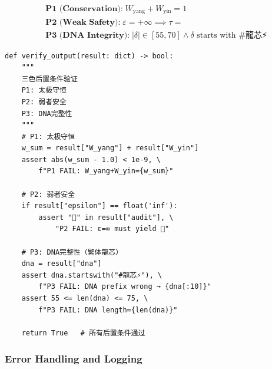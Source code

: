 \documentclass[conference]{IEEEtran}
\begin{document}
\begin{align}
  &\textbf{P1 (Conservation):}\;
    W_{\text{yang}} + W_{\text{yin}} = 1
    \label{pc:conserve} \\
  &\textbf{P2 (Weak Safety):}\;
    \varepsilon = +\infty \implies \tau = \text{🔴}
    \label{pc:weak} \\
  &\textbf{P3 (DNA Integrity):}\;
    |\delta| \in [55, 70] \land
    \delta \text{ starts with } \texttt{\#龍芯⚡️}
    \label{pc:dna}
\end{align}

\begin{lstlisting}[style=python,
  caption={输出验证：三后置条件检查},
  label={lst:verify}]
def verify_output(result: dict) -> bool:
    """
    三色后置条件验证
    P1: 太极守恒
    P2: 弱者安全
    P3: DNA完整性
    """
    # P1: 太极守恒
    w_sum = result["W_yang"] + result["W_yin"]
    assert abs(w_sum - 1.0) < 1e-9, \
        f"P1 FAIL: W_yang+W_yin={w_sum}"

    # P2: 弱者安全
    if result["epsilon"] == float('inf'):
        assert "🔴" in result["audit"], \
            "P2 FAIL: ε=∞ must yield 🔴"

    # P3: DNA完整性（繁体龍芯）
    dna = result["dna"]
    assert dna.startswith("#龍芯⚡️"), \
        f"P3 FAIL: DNA prefix wrong → {dna[:10]}"
    assert 55 <= len(dna) <= 75, \
        f"P3 FAIL: DNA length={len(dna)}"

    return True   # 所有后置条件通过
\end{lstlisting}

\subsubsection{Error Handling and Logging}
\end{document}
